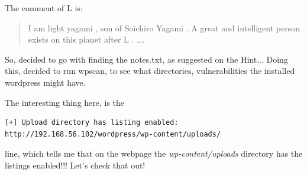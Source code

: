 \documentclass[a4paper,12pt]{article}
\begin{document}
The comment of L is:
\begin{quote}
I am light yagami , son of Soichiro Yagami . A great and intelligent person exists on this planet after L . ….
\end{quote}

So, decided to go with finding the notes.txt, as suggested on the Hint...
Doing this, decided to run wpscan, to see what directories, vulnerabilities the installed wordpress might have.

\newpage
\begin{minipage}[b]{\linewidth}
\scriptsize

\end{minipage}

The interesting thing here, is the
\scriptsize
\begin{verbatim}
[+] Upload directory has listing enabled: http://192.168.56.102/wordpress/wp-content/uploads/
\end{verbatim}
\normalsize
line, which tells me that on the webpage the \textit{wp-content/uploads} directory has the listings enabled!!!
Let's check that out!
\end{document}
